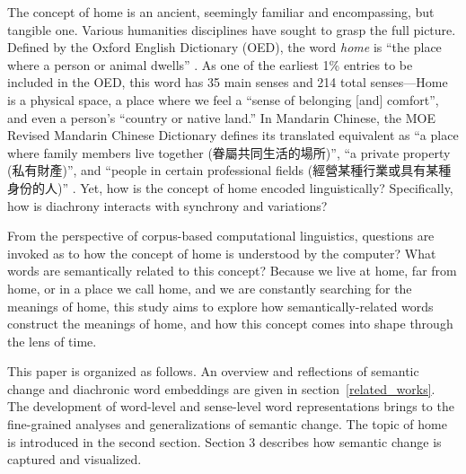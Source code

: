 The concept of home is an ancient, seemingly familiar and encompassing, but tangible one. Various humanities disciplines have sought to grasp the full picture. Defined by the Oxford English Dictionary (OED), the word \textit{home} is ``the place where a person or animal dwells'' . As one of the earliest 1\% entries to be included in the OED, this word has 35 main senses and 214 total senses—Home is a physical space, a place where we feel a ``sense of belonging [and] comfort'', and even a person's ``country or native land.'' In Mandarin Chinese, the MOE Revised Mandarin Chinese Dictionary defines its translated equivalent  as ``a place where family members live together (眷屬共同生活的場所)'', ``a private property (私有財產)'', and ``people in certain professional fields (經營某種行業或具有某種身份的人)'' . Yet, how is the concept of home encoded linguistically? Specifically, how is diachrony interacts with synchrony and variations?

From the perspective of corpus-based computational linguistics, questions are invoked as to how the concept of home is understood by the computer? What words are semantically related to this concept? Because we live at home, far from home, or in a place we call home, and we are constantly searching for the meanings of home, this study aims to explore how semantically-related words construct the meanings of home, and how this concept comes into shape through the lens of time.

This paper is organized as follows. An overview and reflections of semantic change and diachronic word embeddings are given in section~\ref{related_works}. The development of word-level and sense-level word representations brings to the fine-grained analyses and generalizations of semantic change. The topic of home is introduced in the second section. Section 3 describes how semantic change is captured and visualized.

